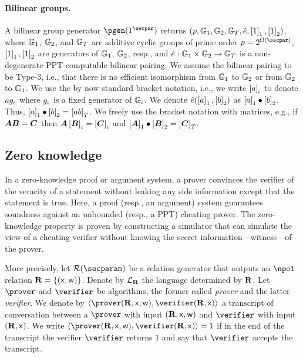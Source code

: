 \documentclass[runningheads,11pt]{llncs}
\let\spvec\vec
\let\vec\accentvec
\let\vec\spvec
\def\vec#1{\mathchoice{\mbox{\boldmath$\displaystyle#1$}}
	{\mbox{\boldmath$\textstyle#1$}}
	{\mbox{\boldmath$\scriptstyle#1$}}
	{\mbox{\boldmath$\scriptscriptstyle#1$}}}
\theoremstyle{definition}
\begin{document}
\paragraph{Bilinear groups.}
A bilinear group generator $\pgen (1^\secpar)$ returns $(p, \mathbb{G}_1, \mathbb{G}_2, \mathbb{G}_T, \hat{e}, \left[1\right]_{1}, \left[1\right]_{2})$, where $\mathbb{G}_1$, $\mathbb{G}_2$, and $\mathbb{G}_T$ are additive cyclic groups of prime order $p = 2^{\Omega (\secpar)}$, $\left[1\right]_{1}, \left[1\right]_{2}$ are generators of $\mathbb{G}_1$, $\mathbb{G}_2$, resp., and $\hat{e}: \mathbb{G}_1 \times \mathbb{G}_2 \to \mathbb{G}_T$ is a non-degenerate PPT-computable bilinear pairing.
We assume the bilinear pairing to be Type-3, i.e., that there is no efficient isomorphism from $\mathbb{G}_1$ to $\mathbb{G}_2$ or from $\mathbb{G}_2$ to $\mathbb{G}_1$.
We use the by now standard bracket notation, i.e., we write $\left[a\right]_{\iota}$ to denote $a g_{\iota}$ where $g_{\iota}$ is a fixed generator of $\mathbb{G}_{\iota}$.
We denote $\hat{e} (\left[a\right]_{1}, \left[b\right]_{2})$ as $\left[a\right]_{1} \bullet \left[b\right]_{2}$.
Thus, $\left[a\right]_{1} \bullet \left[b\right]_{2} = \left[a b\right]_{T}$.
We freely use the bracket notation with matrices, e.g., if $\vec{A} \vec{B} = \vec{C}$ then $\vec{A} \grpgi{\vec{B}} = \grpgi{\vec{C}}$ and $\gone{\vec{A}}\bullet \gtwo{\vec{B}} = \gtar{\vec{C}}$.

\subsection{Zero knowledge}
In a zero-knowledge proof or argument system, a prover convinces the verifier of the veracity of a statement without leaking any side information except that the statement is true.
Here, a proof (resp., an argument) system guarantees soundness against an unbounded (resp., a PPT) cheating prover.
The zero-knowledge property is proven by constructing a simulator that can simulate the view of a cheating verifier without knowing the secret information---witness---of the prover.

More precisely, let $\RELGEN(\secparam)$ be a relation generator that outputs an $\npol$ relation $\mathbf{R} = \{(\mathsf{x}, \mathsf{w})\}$.  Denote by $\mathcal{L}_{\mathbf{R}}$ the language determined by $\mathbf{R}$.
Let $\prover$ and $\verifier$ be algorithms, the former called \emph{prover} and the latter \emph{verifier}.
We denote by $\ip{\prover(\REL, \inp, \wit)}{\verifier(\REL, \inp)}$ a transcript of conversation between a $\prover$ with input $(\mathbf{R}, \mathsf{x}, \mathsf{w})$ and $\verifier$ with input $(\mathbf{R}, \mathsf{x})$.
We write $\ip{\prover (\REL, \inp, \wit)}{\verifier(\REL, \inp)} = 1$ if in the end of the transcript the verifier $\verifier$ returns $1$ and say that $\verifier$ accepts the transcript.
\end{document}
